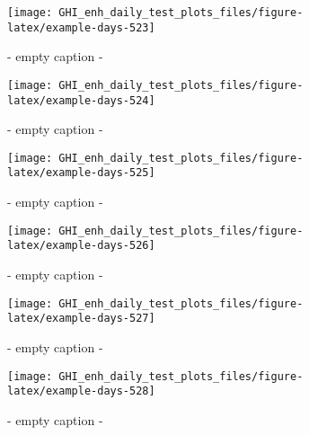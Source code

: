 \documentclass[
  10pt,
  a4paper,oneside]{article}
\begin{document}
\begin{figure}[H]

{\centering \texttt{[image: GHI\_enh\_daily\_test\_plots\_files/figure-latex/example-days-523]} 

}

\caption{ - empty caption - }\label{fig:example-days-523}
\end{figure}

\begin{figure}[H]

{\centering \texttt{[image: GHI\_enh\_daily\_test\_plots\_files/figure-latex/example-days-524]} 

}

\caption{ - empty caption - }\label{fig:example-days-524}
\end{figure}

\begin{figure}[H]

{\centering \texttt{[image: GHI\_enh\_daily\_test\_plots\_files/figure-latex/example-days-525]} 

}

\caption{ - empty caption - }\label{fig:example-days-525}
\end{figure}

\begin{figure}[H]

{\centering \texttt{[image: GHI\_enh\_daily\_test\_plots\_files/figure-latex/example-days-526]} 

}

\caption{ - empty caption - }\label{fig:example-days-526}
\end{figure}

\begin{figure}[H]

{\centering \texttt{[image: GHI\_enh\_daily\_test\_plots\_files/figure-latex/example-days-527]} 

}

\caption{ - empty caption - }\label{fig:example-days-527}
\end{figure}

\begin{figure}[H]

{\centering \texttt{[image: GHI\_enh\_daily\_test\_plots\_files/figure-latex/example-days-528]} 

}

\caption{ - empty caption - }\label{fig:example-days-528}
\end{figure}
\end{document}
